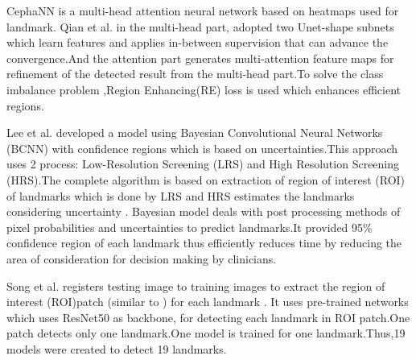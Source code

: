 \documentclass[sn-mathphys]{sn-jnl}%
\theoremstyle{thmstyleone}%
\theoremstyle{thmstyletwo}%
\theoremstyle{thmstylethree}%
\begin{document}
\par CephaNN is a multi-head attention neural network based on heatmaps used for landmark. Qian et al. \cite{qian2020cephann} in the multi-head part, adopted two Unet-shape subnets which learn features  and applies in-between supervision that can advance the  convergence.And the attention part generates multi-attention feature maps for refinement of the detected result from the multi-head part.To solve the class imbalance problem ,Region Enhancing(RE) loss is used which enhances efficient regions.   

\par Lee et al. \cite{lee2020automated} developed a model using Bayesian Convolutional Neural Networks (BCNN) with confidence regions which is based on uncertainties.This approach uses 2 process: Low-Resolution Screening (LRS) and High Resolution Screening (HRS).The complete algorithm is based on extraction of region of interest (ROI)  of landmarks which is done by LRS and HRS estimates the landmarks considering uncertainty . Bayesian model deals with post processing methods of pixel probabilities and uncertainties to predict landmarks.It provided 95\% confidence region of each landmark thus efficiently reduces time by reducing the area of consideration for decision making by clinicians.

\par Song et al. \cite{song2020automatic} registers  testing image to training images to extract the region of interest (ROI)patch (similar to \cite{lee2020automated}) for each landmark . It uses pre-trained networks which uses  ResNet50 as backbone, for detecting each landmark in ROI patch.One patch detects only one landmark.One model is trained for one landmark.Thus,19 models were created to detect 19 landmarks.

\end{document}
